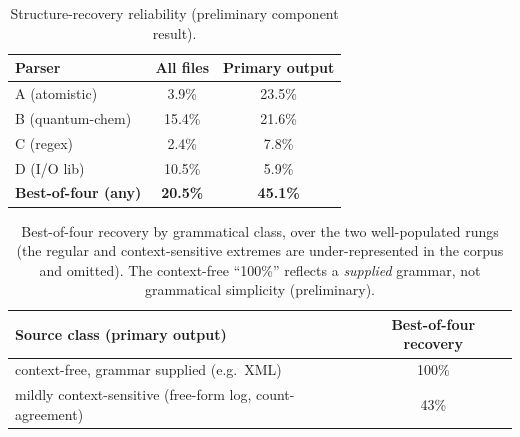 \documentclass{article}
\begin{document}
\begin{table}[h]
\centering\small
\begin{tabular}{lcc}
\toprule
Parser & All files & Primary output \\
\midrule
A (atomistic) & 3.9\% & 23.5\% \\
B (quantum-chem) & 15.4\% & 21.6\% \\
C (regex) & 2.4\% & 7.8\% \\
D (I/O lib) & 10.5\% & 5.9\% \\
\midrule
\textbf{Best-of-four (any)} & \textbf{20.5\%} & \textbf{45.1\%} \\
\bottomrule
\end{tabular}
\caption{Structure-recovery reliability (preliminary component result).}
\label{tab:rel}
\end{table}

\begin{table}[h]
\centering\small
\begin{tabular}{lc}
\toprule
Source class (primary output) & Best-of-four recovery \\
\midrule
context-free, grammar supplied (e.g.\ XML) & 100\% \\
mildly context-sensitive (free-form log, count-agreement) & 43\% \\
\bottomrule
\end{tabular}
\caption{Best-of-four recovery by grammatical class, over the two well-populated rungs
(the regular and context-sensitive extremes are under-represented in the corpus and
omitted). The context-free ``100\%'' reflects a \emph{supplied} grammar, not grammatical
simplicity (preliminary).}
\label{tab:class}
\end{table}
\end{document}
